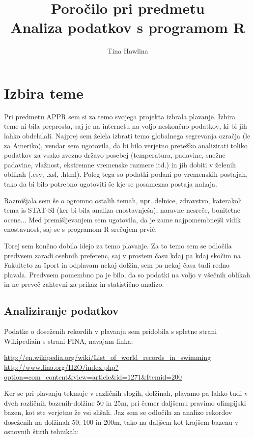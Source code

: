 \documentclass[11pt,a4paper]{article}
\begin{document}
\title{Poročilo pri predmetu \\
Analiza podatkov s programom R}
\author{Tina Hawlina}
\maketitle

\section{Izbira teme}

Pri predmetu APPR sem si za temo svojega projekta izbrala plavanje. Izbira teme ni bila preprosta, saj je na internetu na voljo neskončno podatkov, ki bi jih lahko obdelalali. Najprej sem želela izbrati temo globalnega segrevanja ozračja (le za Ameriko), vendar sem ugotovila, da bi bilo verjetno pretežko analizirati toliko podatkov za vsako zvezno državo posebej (temperatura, padavine, snežne padavine, vlažnost, ekstremne vremenske razmere itd.) in jih dobiti v želenih oblikah (.csv, .xsl, .html). Poleg tega so podatki podani po vremenskih postajah, tako da bi bilo potrebno ugotoviti še kje se posamezna postaja nahaja.

Razmišjala sem še o ogromno ostalih temah, npr. delnice, zdravstvo, katerakoli tema is STAT-SI (ker bi bila analiza enostavnješa), naravne nesreče, bonitetne ocene... Med premišljevanjem sem ugotovila, da je zame najpomembnejši vidik enostavnost, saj se s programom R srečujem prvič.

Torej sem končno dobila idejo za temo plavanje. Za to temo sem se odločila predvsem zaradi osebnih preferenc, saj v prostem času kdaj pa kdaj skočim na Fakulteto za šport in odplavam nekaj dolžin, sem pa nekaj časa tudi redno plavala. Predvsem pomembno pa je bilo, da so podatki na voljo v všečnih oblikah in ne preveč zahtevni za prikaz in statistično analizo. 


\subsection{Analiziranje podatkov}


Podatke o doseženih rekordih v plavanju sem pridobila s spletne strani Wikipediain s strani FINA, navajam linka:

\url{http://en.wikipedia.org/wiki/List_of_world_records_in_swimming}
\url{http://www.fina.org/H2O/index.php?option=com_content&view=article&id=1271&Itemid=200}

Ker se pri plavanju tekmuje v različnih slogih, dolžinah, plavamo pa lahko tudi v dveh različnih bazenih-dolžine 50 in 25m, pri čemer daljšemu pravimo olimpijski bazen, kot ste verjetno že vsi slišali. Jaz sem se odločila za analizo rekordov doseženih na dolžinah 50, 100 in 200m, tako na daljšem kot krajšem bazenu v osnovnih štirih tehnikah:
\end{document}
